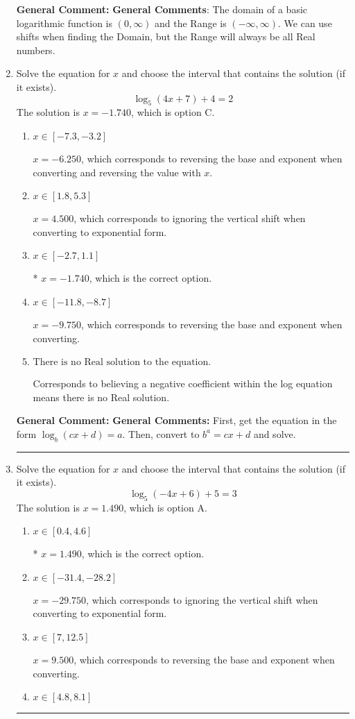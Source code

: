 \documentclass{extbook}[14pt]
\newcommand{\litem}[1]{\item #1

\rule{\textwidth}{0.4pt}}
\begin{document}
\begin{enumerate}
{\textbf{General Comment:} \textbf{General Comments}: The domain of a basic logarithmic function is $(0, \infty)$ and the Range is $(-\infty, \infty)$. We can use shifts when finding the Domain, but the Range will always be all Real numbers.
}
\litem{
Solve the equation for $x$ and choose the interval that contains the solution (if it exists).
\[ \log_{5}{(4x+7)}+4 = 2 \]
The solution is \( x = -1.740 \), which is option C.\begin{enumerate}[label=\Alph*.]
\item \( x \in [-7.3, -3.2] \)

$x = -6.250$, which corresponds to reversing the base and exponent when converting and reversing the value with $x$.
\item \( x \in [1.8, 5.3] \)

$x = 4.500$, which corresponds to ignoring the vertical shift when converting to exponential form.
\item \( x \in [-2.7, 1.1] \)

* $x = -1.740$, which is the correct option.
\item \( x \in [-11.8, -8.7] \)

$x = -9.750$, which corresponds to reversing the base and exponent when converting.
\item \( \text{There is no Real solution to the equation.} \)

Corresponds to believing a negative coefficient within the log equation means there is no Real solution.
\end{enumerate}

\textbf{General Comment:} \textbf{General Comments:} First, get the equation in the form $\log_b{(cx+d)} = a$. Then, convert to $b^a = cx+d$ and solve.
}
\litem{
Solve the equation for $x$ and choose the interval that contains the solution (if it exists).
\[ \log_{5}{(-4x+6)}+5 = 3 \]
The solution is \( x = 1.490 \), which is option A.\begin{enumerate}[label=\Alph*.]
\item \( x \in [0.4, 4.6] \)

* $x = 1.490$, which is the correct option.
\item \( x \in [-31.4, -28.2] \)

$x = -29.750$, which corresponds to ignoring the vertical shift when converting to exponential form.
\item \( x \in [7, 12.5] \)

$x = 9.500$, which corresponds to reversing the base and exponent when converting.
\item \( x \in [4.8, 8.1] \)


\end{enumerate}}
\end{enumerate}
\end{document}
